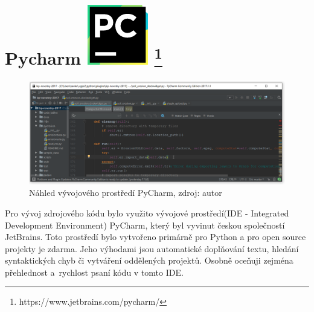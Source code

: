 \section[PyCharm]{Pycharm \includegraphics[scale=0.2]
{./pictures/pycharm.png} \footnote{https://www.jetbrains.com/pycharm/}}
\label{python}
\vspace{-10pt}
\begin{figure}[H]
    \centering \includegraphics[scale=0.45]{./pictures/pycharm_screen.png}
      \caption[Náhled vývojového prostředí PyCharm]{Náhled vývojového 
      prostředí PyCharm, zdroj: autor}
      \label{screen:pycharm}
\end{figure}
\vspace{-10pt}
Pro vývoj zdrojového kódu bylo využito vývojové prostředí(IDE - 
Integrated Development Environment)  PyCharm, který byl vyvinut 
českou společností JetBrains. Toto prostředí bylo vytvořeno primárně 
pro Python a pro open source projekty je zdarma. Jeho výhodami jsou 
automatické doplňování textu, hledání syntaktických chyb či vytváření 
oddělených projektů. Osobně oceňuji zejména přehlednost a~rychlost 
psaní kódu v tomto IDE.\cite{masteringPycharm}
